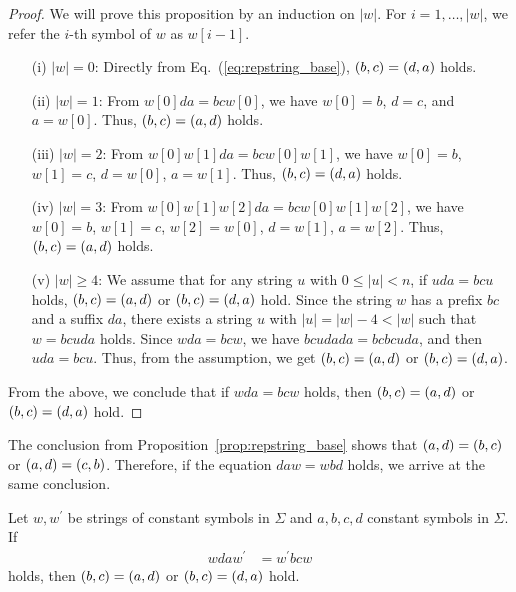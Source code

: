 \begin{proof}
  We will prove this proposition by an induction on $|w|$.
  For $i=1,\ldots,|w|$, we refer the $i$-th symbol of $w$ as $w[i - 1]$. 
  \begin{enumerate}
  \item[(i)] $|w| = 0$: Directly from Eq.~(\ref{eq:repstring_base}), $(b,c) = (d,a)$ holds.
  \item[(ii)] $|w| = 1$: From $w[0]da = bcw[0]$, we have $w[0] = b$, $d = c$, and $a = w[0]$. Thus, $(b,c) = (a,d)$ holds.
  \item[(iii)] $|w| = 2$: From $w[0]w[1]da = bcw[0]w[1]$, we have $w[0] = b$, $w[1] = c$, $d = w[0]$, $a = w[1]$. Thus, $(b,c) = (d,a)$ holds.
  \item[(iv)] $|w| = 3$: From $w[0]w[1]w[2]da = bcw[0]w[1]w[2]$, we have $w[0] = b$, $w[1] = c$, $w[2] = w[0]$, $d = w[1]$, $a = w[2]$. Thus, $(b,c) = (a,d)$ holds.
  \item[(v)] $|w| \ge 4$: We assume that for any string $u$ with $0\leq |u| < n$, if $uda = bcu$ holds, $(b,c) = (a,d)$ or $(b,c) = (d,a)$ hold. Since the string $w$ has a prefix $bc$ and a suffix $da$, there exists a string $u$ with $|u| = |w| - 4 < |w|$ such that $w = bcuda$ holds. Since $wda = bcw$, we have $bcudada = bcbcuda$, and then $uda = bcu$. Thus, from the assumption, we get $(b,c) = (a,d)$ or $(b,c) = (d,a)$.
  \end{enumerate}
From the above, we conclude that if $wda = bcw$ holds, then $(b,c) = (a,d)$ or $(b,c) = (d,a)$ hold.
\end{proof}

The conclusion from Proposition~\ref{prop:repstring_base} shows that $(a,d) = (b,c)$ or $(a,d) = (c,b)$. Therefore, if the equation $daw = wbd$ holds, we arrive at the same conclusion.

\begin{prop}\label{prop:repstring}
Let $w,w^{\prime}$ be strings of constant symbols in $\Sigma$ and $a,b,c,d$ constant symbols in $\Sigma$.
If
\begin{align}
  wdaw^{\prime} & = w^{\prime}bcw\label{eq:repstring}
\end{align}
holds, then $(b,c) = (a,d)$ or $(b,c) = (d,a)$ hold.\label{prop:repstring_eq}
\end{prop}

